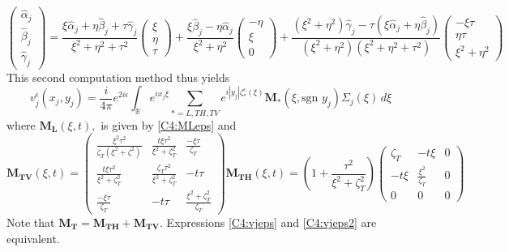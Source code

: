 \begin{equation}
    \begin{pmatrix}
    \hat{\alpha}_j\\ \hat{\beta}_j\\ \hat{\gamma}_j
    \end{pmatrix}
    = \frac{\xi\hat{\alpha}_j+\eta\hat{\beta}_j+\tau\hat{\gamma}_j}{\xi^2+\eta^2+\tau^2}\begin{pmatrix}
    \xi \\ \eta \\ \tau 
    \end{pmatrix} + \frac{\xi\hat{\beta}_j-\eta\hat{\alpha}_j}{\xi^2+\eta^2} \begin{pmatrix}
    -\eta \\ \xi \\ 0
    \end{pmatrix} + \frac{(\xi^2+\eta^2)\hat{\gamma}_j-\tau(\xi\hat{\alpha}_j+\eta\hat{\beta}_j)}{(\xi^2+\eta^2)(\xi^2+\eta^2+\tau^2)} \begin{pmatrix}
    -\xi\tau \\ \eta\tau \\ \xi^2+\eta^2
    \end{pmatrix}
\end{equation}
This second computation method thus yields
\begin{equation}
v_j^{\epsilon}(x_j,y_j)=\frac{i}{4\pi}e^{2i\epsilon}\int_{\mathbb{R}} e^{ix_j\xi}\sum_{*=L,TH,TV}e^{i|y_j|\zeta_*^{\epsilon}(\xi)}\mathbf{M_*}(\xi,\mbox{sgn }y_j)\Sigma_j(\xi)\,d\xi
\label{C4:vjeps2}
\end{equation}
where $\mathbf{M_L}(\xi,t),$ is given by \eqref{C4:MLeps} and
\begin{subequations}
\begin{equation}
\mathbf{M_{TV}}(\xi,t)=\begin{pmatrix}
\frac{\xi^2\tau^2}{\zeta_T(\xi^2+\zeta^2)}&\frac{t\xi\tau^2}{\xi^2+\zeta_T^2}&\frac{-\xi\tau}{\zeta_T}\\
\frac{t\xi\tau^2}{\xi^2+\zeta_T^2}&\frac{\zeta_T\tau^2}{\xi^2+\zeta_T^2}&-t\tau\\
\frac{-\xi\tau}{\zeta_T}&-t\tau&\frac{\xi^2+\zeta_T^2}{\zeta_T}
\end{pmatrix}
\label{C4:MTVeps}
\end{equation}
\begin{equation}
\mathbf{M_{TH}}(\xi,t)=\left(1+\frac{\tau^2}{\xi^2+\zeta_T^2}\right)\begin{pmatrix}
\zeta_T&-t\xi&0\\
-t\xi&\frac{\xi^2}{\zeta_T}&0\\
0&0&0
\end{pmatrix}
\label{C4:MTHeps}
\end{equation}
\label{C4:M*eps2}
\end{subequations}
Note that $ \mathbf{M_T}=\mathbf{M_{TH}}+\mathbf{M_{TV}}$. Expressions \eqref{C4:vjeps} and \eqref{C4:vjeps2} are equivalent.

